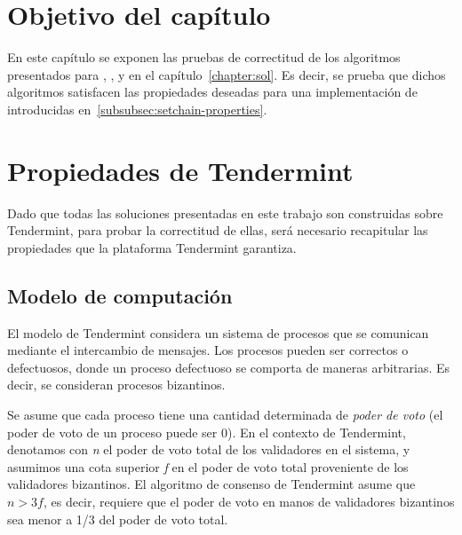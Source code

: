\section{Objetivo del capítulo}
En este capítulo se exponen las pruebas de correctitud de los algoritmos presentados para
\vanilla, \compresschain, y \hashchain en el capítulo~\ref{chapter:sol}.
Es decir, se prueba que dichos algoritmos satisfacen las propiedades deseadas para una
implementación de \setchain introducidas en~\ref{subsubsec:setchain-properties}.

\section{Propiedades de Tendermint}\label{sec:properties}
Dado que todas las soluciones presentadas en este trabajo son construidas sobre Tendermint,
para probar la correctitud de ellas, será necesario recapitular las propiedades que la
plataforma Tendermint garantiza.

\subsection{Modelo de computación}
El modelo de Tendermint considera un sistema de procesos que se comunican mediante el intercambio de
mensajes.
Los procesos pueden ser correctos o defectuosos, donde un proceso defectuoso se comporta de maneras
arbitrarias. Es decir, se consideran procesos bizantinos.

Se asume que cada proceso tiene una cantidad determinada de \textit{poder de voto} (el poder de
voto de un proceso puede ser 0).
%
En el contexto de Tendermint, denotamos con \textit{n} el poder de voto total de los validadores
en el sistema, y asumimos una cota superior \textit{f} en el poder de voto total proveniente de
los validadores bizantinos.
%
El algoritmo de consenso de Tendermint asume que $n > 3f$, es decir, requiere que el poder de voto
en manos de validadores bizantinos sea menor a 1/3 del poder de voto total.


